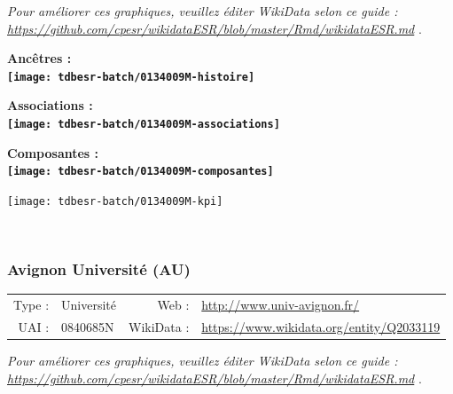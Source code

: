 \documentclass[12pt,french,]{article}
\begin{document}
\textit{\scriptsize Pour améliorer ces graphiques, veuillez éditer WikiData selon ce guide :  \href{https://github.com/cpesr/wikidataESR/blob/master/Rmd/wikidataESR.md}{https://github.com/cpesr/wikidataESR/blob/master/Rmd/wikidataESR.md}}
.

\vspace{1cm}  
\begin{minipage}[b]{0.50\textwidth}\begin{center} \bf Ancêtres : \\  
\texttt{[image: tdbesr-batch/0134009M-histoire]} \end{center}\end{minipage}\begin{minipage}[b]{0.50\textwidth}\begin{center} \bf Associations : \\  
\texttt{[image: tdbesr-batch/0134009M-associations]} \end{center}\end{minipage}

\hrulefill

\begin{center} \bf Composantes : \\  
\texttt{[image: tdbesr-batch/0134009M-composantes]} \end{center}

\begin{center}\texttt{[image: tdbesr-batch/0134009M-kpi]} \end{center}\checkoddpage

\ifoddpage \fi ~\newpage  

\hypertarget{avignon-universituxe9-au}{%
\subsubsection{Avignon Université (AU)}\label{avignon-universituxe9-au}}

\begin{tabular*}{\textwidth}{rp{5cm}rl}  
\hline  
Type : & Université & Web : &\href{http://www.univ-avignon.fr/}{http://www.univ-avignon.fr/} \\  
UAI : & 0840685N & WikiData : & \href{https://www.wikidata.org/entity/Q2033119}{https://www.wikidata.org/entity/Q2033119} \\  
\hline  
\end{tabular*}

\textit{\scriptsize Pour améliorer ces graphiques, veuillez éditer WikiData selon ce guide :  \href{https://github.com/cpesr/wikidataESR/blob/master/Rmd/wikidataESR.md}{https://github.com/cpesr/wikidataESR/blob/master/Rmd/wikidataESR.md}}
.
\end{document}
